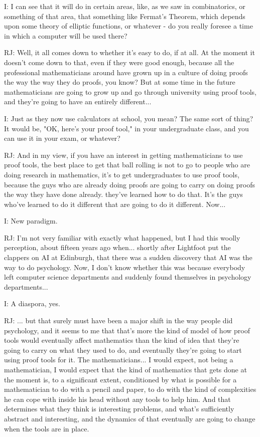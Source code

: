 \documentclass[10pt,titlepage]{book}
\begin{document}
I: I can see that it will do in certain areas, like, as we saw in combinatorics, or something of that area, that something like Fermat's Theorem, which depends upon some theory of elliptic functions, or whatever - do you really foresee a time in which a computer will be used there?

RJ: Well, it all comes down to whether it's easy to do, if at all. At the moment it doesn't come down to that, even if they were good enough, because all the professional mathematicians around have grown up in a culture of doing proofs the way the way they do proofs, you know? But at some time in the future mathematicians are going to grow up and go through university using proof tools, and they're going to have an entirely different...

I: Just as they now use calculators at school, you mean? The same sort of thing? It would be, "OK, here's your proof tool," in your undergraduate class, and you can use it in your exam, or whatever?

RJ: And in my view, if you have an interest in getting mathematicians to use proof tools, the best place to get that ball rolling is not to go to people who are doing research in mathematics, it's to get undergraduates to use proof tools, because the guys who are already doing proofs are going to carry on doing proofs the way they have done already.  they've learned how to do that. It's the guys who've learned to do it different that are going to do it different. Now...

I: New paradigm.

RJ: I'm not very familiar with exactly what happened, but I had this woolly perception, about fifteen years ago when... shortly after Lightfoot put the clappers on AI at Edinburgh, that there was a sudden discovery that AI was the way to do psychology. Now, I don't know whether this was because everybody left computer science departments and suddenly found themselves in psychology departments...

I: A diaspora, yes.

RJ: ... but that surely must have been a major shift in the way people did psychology, and it seems to me that that's more the kind of model of how proof tools would eventually affect mathematics than the kind of idea that they're going to carry on what they used to do, and eventually they're going to start using proof tools for it. The mathematicians... I would expect, not being a mathematician, I would expect that the kind of mathematics that gets done at the moment is, to a significant extent, conditioned by what is possible for a mathematician to do with a pencil and paper, to do with the kind of complexities he can cope with inside his head without any tools to help him. And that determines what they think is interesting problems, and what's sufficiently abstract and interesting, and the dynamics of that eventually are going to change when the tools are in place.
\end{document}
